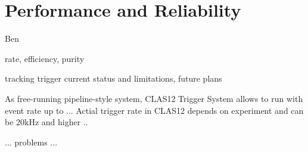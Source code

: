 \section{Performance and Reliability} Ben



rate, efficiency, purity

tracking trigger current status and limitations, future plans



As free-running pipeline-style system, CLAS12 Trigger System allows to run with event rate up to ...
Actial trigger rate in CLAS12 depends on experiment and can be 20kHz and higher ..

... problems ...